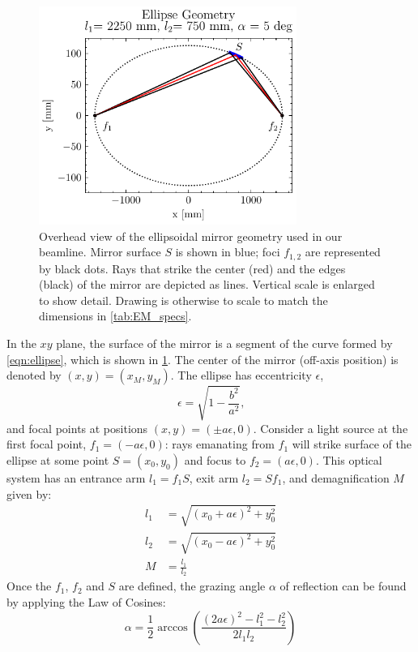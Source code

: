 \begin{figure}
	\centering
	\includegraphics[width=0.75\textwidth]{figures/chap2/EM_2D.pdf}
	\caption{Overhead view of the ellipsoidal mirror geometry used in our beamline. Mirror surface $S$ is shown in blue; foci $f_{1,2}$ are represented by black dots. Rays that strike the center (red) and the edges (black) of the mirror are depicted as lines. Vertical scale is enlarged to show detail. Drawing is otherwise to scale to match the dimensions in \cref{tab:EM_specs}.}
	\label{fig:EM_2D}
\end{figure}

In the $xy$ plane, the surface of the mirror is a segment of the curve formed by \cref{eqn:ellipse}, which is shown in \cref{fig:EM_2D}. The center of the mirror (off-axis position) is denoted by $(x,y)=(x_M, y_M)$. The ellipse has eccentricity $\epsilon$,
\begin{equation}
\epsilon = \sqrt{1-\frac{b^2}{a^2} } \text{,}
\end{equation}
and focal points at positions $(x,y) = (\pm a \epsilon,0)$. Consider a light source at the first focal point,  $f_1 = (-a \epsilon,0)$: rays emanating from $f_1$ will strike surface of the ellipse at some point $S = (x_0, y_0)$ and focus to $f_2 = (a \epsilon,0)$. This optical system has an entrance arm $l_1 = f_1S$, exit arm $l_2=Sf_1$, and demagnification $M$ given by:
\begin{align}
l_1 &= \sqrt{ (x_0+a \epsilon)^2 + y_0^2 } \\
l_2 &= \sqrt{ (x_0-a \epsilon)^2 + y_0^2 } \\
M &= \frac{l_1}{l_2}
\end{align}
Once the $f_1$, $f_2$ and $S$ are defined, the grazing angle $\alpha$ of reflection can be found by applying the Law of Cosines:
\begin{equation}
\alpha = \frac{1}{2} \arccos \left( \frac{(2 a \epsilon)^2 - l_1^2 - l_2^2}{2 l_1 l_2} \right)
\end{equation}

